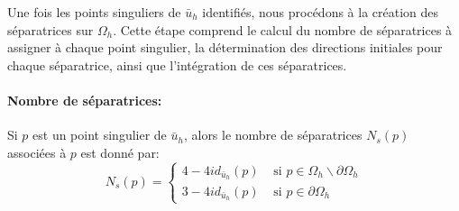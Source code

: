 Une fois les points singuliers de $\bar{u}_h$ identifiés, nous procédons à la création des séparatrices sur $\Omega_h$. Cette étape comprend le calcul du nombre de séparatrices à assigner à chaque point singulier, la détermination des directions initiales pour chaque séparatrice, ainsi que l'intégration de ces séparatrices.

\paragraph{Nombre de séparatrices:} Si $p$ est un point singulier de $\bar{u}_h$, alors le nombre de séparatrices $N_s(p)$ associées à $p$ est donné par:
\begin{equation}
    N_s(p) =
    \left\{
    \begin{array}{ll}
    4-4id_{\bar{u}_h}(p) & \mbox{ si } p\in\Omega_h\backslash\partial\Omega_h\\[0.3cm]
    3-4id_{\bar{u}_h}(p) & \mbox{ si } p\in\partial\Omega_h
    \end{array}
    \right.
\end{equation}

